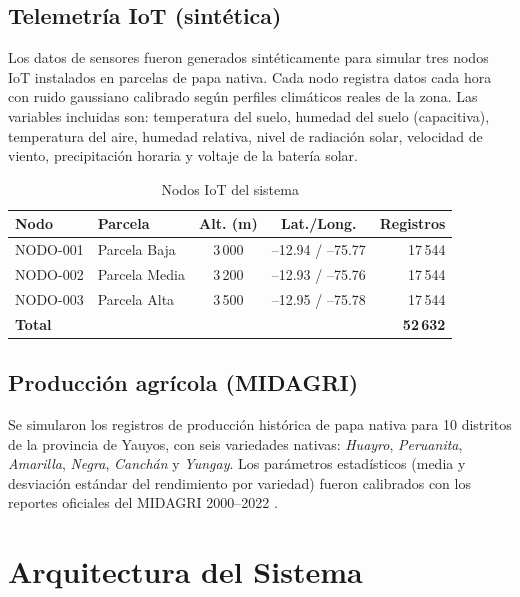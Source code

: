 \documentclass[12pt,a4paper]{article}
\begin{document}
\subsection{Telemetría IoT (sintética)}

Los datos de sensores fueron generados sintéticamente para simular tres
nodos IoT instalados en parcelas de papa nativa. Cada nodo registra
datos cada hora con ruido gaussiano calibrado según perfiles climáticos
reales de la zona. Las variables incluidas son: temperatura del suelo,
humedad del suelo (capacitiva), temperatura del aire, humedad relativa,
nivel de radiación solar, velocidad de viento, precipitación horaria y
voltaje de la batería solar.

\begin{table}[H]
\centering
\caption{Nodos IoT del sistema}
\label{tab:nodos}
\begin{tabular}{llccr}
\toprule
\textbf{Nodo} & \textbf{Parcela} & \textbf{Alt. (m)} &
\textbf{Lat./Long.} & \textbf{Registros} \\
\midrule
NODO-001 & Parcela Baja  & 3\,000 & --12.94 / --75.77 & 17\,544 \\
NODO-002 & Parcela Media & 3\,200 & --12.93 / --75.76 & 17\,544 \\
NODO-003 & Parcela Alta  & 3\,500 & --12.95 / --75.78 & 17\,544 \\
\midrule
\textbf{Total} & & & & \textbf{52\,632} \\
\bottomrule
\end{tabular}
\end{table}

\subsection{Producción agrícola (MIDAGRI)}

Se simularon los registros de producción histórica de papa nativa para
10 distritos de la provincia de Yauyos, con seis variedades nativas:
\textit{Huayro}, \textit{Peruanita}, \textit{Amarilla}, \textit{Negra},
\textit{Canchán} y \textit{Yungay}. Los parámetros estadísticos (media
y desviación estándar del rendimiento por variedad) fueron calibrados
con los reportes oficiales del MIDAGRI 2000--2022 \cite{midagri2023}.

\section{Arquitectura del Sistema}
\end{document}
